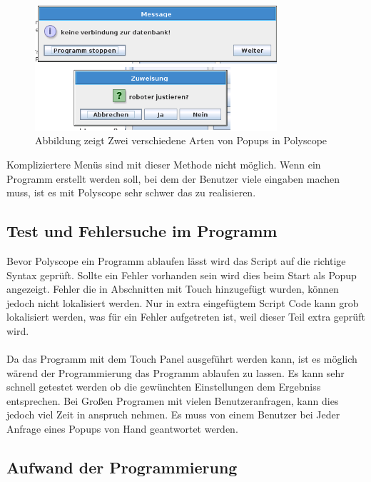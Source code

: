 \begin{figure}[H]
  \centering
    \includegraphics[width=0.8\textwidth]{pic/popup_question.png}
      \caption[Popup in Polyscipe]{Abbildung zeigt Zwei verschiedene Arten von Popups in Polyscope}
      \label{fig:polyscope_popup}
\end{figure}

Kompliziertere Menüs sind mit dieser Methode nicht möglich. Wenn ein Programm erstellt werden soll, bei dem der Benutzer viele eingaben machen muss, ist es mit Polyscope sehr schwer das zu realisieren.

\subsection{Test und Fehlersuche im Programm}
\label{debuggin_polyscope_rel}

Bevor Polyscope ein Programm ablaufen lässt wird das Script auf die richtige Syntax geprüft. Sollte ein Fehler vorhanden sein wird dies beim Start als Popup angezeigt. Fehler die in Abschnitten mit Touch hinzugefügt wurden, können jedoch nicht lokalisiert werden. Nur in extra eingefügtem Script Code kann grob lokalisiert werden, was für ein Fehler aufgetreten ist, weil dieser Teil extra geprüft wird.
\\\\
Da das Programm mit dem Touch Panel ausgeführt werden kann, ist es möglich wärend der Programmierung das Programm ablaufen zu lassen. Es kann sehr schnell getestet werden ob die gewünchten Einstellungen dem Ergebniss entsprechen. Bei Großen Programen mit vielen Benutzeranfragen, kann dies jedoch viel Zeit in anspruch nehmen. Es muss von einem Benutzer bei Jeder Anfrage eines Popups von Hand geantwortet werden.

\subsection{Aufwand der Programmierung}
\label{polyscope_aufwand}

